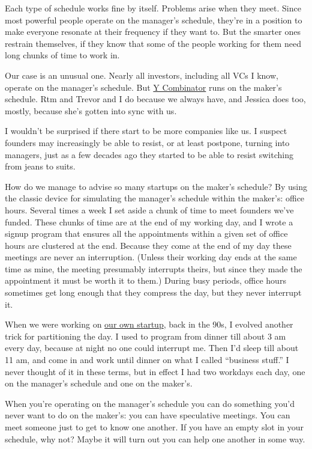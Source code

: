 \documentclass[12pt]{book}
\begin{document}
Each type of schedule works fine by itself. Problems arise when they
meet. Since most powerful people operate on the manager's schedule,
they're in a position to make everyone resonate at their frequency if
they want to. But the smarter ones restrain themselves, if they know
that some of the people working for them need long chunks of time to
work in.

Our case is an unusual one. Nearly all investors, including all VCs I
know, operate on the manager's schedule. But
\href{http://ycombinator.com}{Y Combinator} runs on the maker's
schedule. Rtm and Trevor and I do because we always have, and Jessica
does too, mostly, because she's gotten into sync with us.

I wouldn't be surprised if there start to be more companies like us. I
suspect founders may increasingly be able to resist, or at least
postpone, turning into managers, just as a few decades ago they started
to be able to resist switching from jeans to suits.

How do we manage to advise so many startups on the maker's schedule? By
using the classic device for simulating the manager's schedule within
the maker's: office hours. Several times a week I set aside a chunk of
time to meet founders we've funded. These chunks of time are at the end
of my working day, and I wrote a signup program that ensures all the
appointments within a given set of office hours are clustered at the
end. Because they come at the end of my day these meetings are never an
interruption. (Unless their working day ends at the same time as mine,
the meeting presumably interrupts theirs, but since they made the
appointment it must be worth it to them.) During busy periods, office
hours sometimes get long enough that they compress the day, but they
never interrupt it.

When we were working on \href{start.html}{our own startup}, back in the
90s, I evolved another trick for partitioning the day. I used to program
from dinner till about 3 am every day, because at night no one could
interrupt me. Then I'd sleep till about 11 am, and come in and work
until dinner on what I called ``business stuff.'' I never thought of it
in these terms, but in effect I had two workdays each day, one on the
manager's schedule and one on the maker's.

When you're operating on the manager's schedule you can do something
you'd never want to do on the maker's: you can have speculative
meetings. You can meet someone just to get to know one another. If you
have an empty slot in your schedule, why not? Maybe it will turn out you
can help one another in some way.
\end{document}
